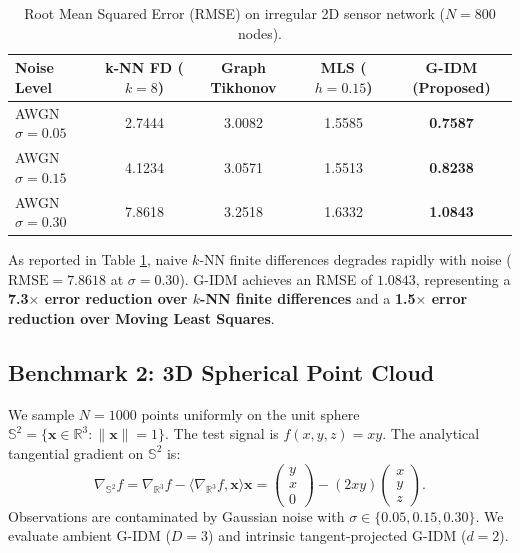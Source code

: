 \documentclass[11pt,a4paper]{article}
\theoremstyle{definition}
\begin{document}
\begin{table}[htbp]
\centering
\footnotesize
\setlength{\tabcolsep}{3pt}
\caption{Root Mean Squared Error (RMSE) on irregular 2D sensor network ($N = 800$ nodes).}
\label{tab:sensor_results}
\begin{tabular*}{\textwidth}{@{\extracolsep{\fill}}lcccc@{}}
\toprule
\textbf{Noise Level} & \textbf{k-NN FD ($k=8$)} & \textbf{Graph Tikhonov} & \textbf{MLS ($h=0.15$)} & \textbf{G-IDM (Proposed)} \\
\midrule
AWGN $\sigma = 0.05$ & 2.7444 & 3.0082 & 1.5585 & \textbf{0.7587} \\
AWGN $\sigma = 0.15$ & 4.1234 & 3.0571 & 1.5513 & \textbf{0.8238} \\
AWGN $\sigma = 0.30$ & 7.8618 & 3.2518 & 1.6332 & \textbf{1.0843} \\
\bottomrule
\end{tabular*}
\end{table}

As reported in Table \ref{tab:sensor_results}, naive $k$-NN finite differences degrades rapidly with noise ($\text{RMSE} = 7.8618$ at $\sigma = 0.30$). G-IDM achieves an RMSE of $1.0843$, representing a \textbf{7.3$\times$ error reduction over $k$-NN finite differences} and a \textbf{1.5$\times$ error reduction over Moving Least Squares}.

\subsection{Benchmark 2: 3D Spherical Point Cloud}
We sample $N = 1000$ points uniformly on the unit sphere $\mathbb{S}^2 = \{\mathbf{x} \in \mathbb{R}^3 : \|\mathbf{x}\| = 1\}$. 
The test signal is $f(x, y, z) = x y$. The analytical tangential gradient on $\mathbb{S}^2$ is:
\begin{equation}
\nabla_{\mathbb{S}^2} f = \nabla_{\mathbb{R}^3} f - \langle \nabla_{\mathbb{R}^3} f, \mathbf{x} \rangle \mathbf{x} = \begin{pmatrix} y \\ x \\ 0 \end{pmatrix} - (2xy) \begin{pmatrix} x \\ y \\ z \end{pmatrix}.
\end{equation}
Observations are contaminated by Gaussian noise with $\sigma \in \{0.05, 0.15, 0.30\}$. We evaluate ambient G-IDM ($D = 3$) and intrinsic tangent-projected G-IDM ($d = 2$).
\end{document}
